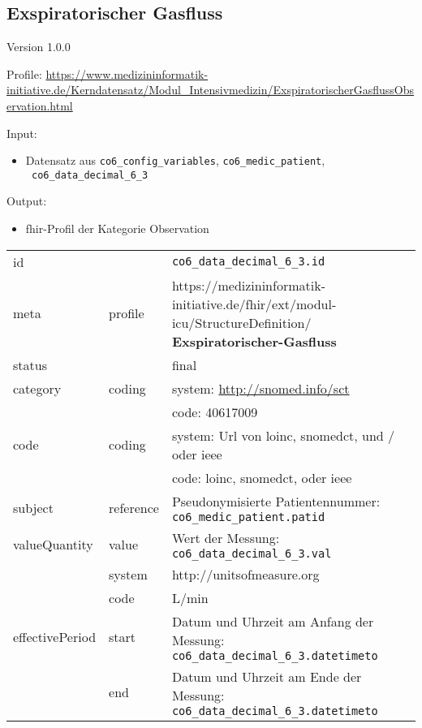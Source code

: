 \subsection{
Exspiratorischer Gasfluss} 
\noindent Version 1.0.0

\noindent Profile: \url{https://www.medizininformatik-initiative.de/Kerndatensatz/Modul_Intensivmedizin/ExspiratorischerGasflussObservation.html}

\noindent Input:
\begin{itemize}
	\item Datensatz aus \texttt{co6\_config\_variables}, \texttt{co6\_medic\_patient}, \\ \texttt{
co6\_data\_decimal\_6\_3}
\end{itemize}
Output:
\begin{itemize}
        \item \ac{fhir}-Profil der Kategorie \glqq Observation\grqq{}
\end{itemize}
\begin{longtable}{|l|l|p{7.5cm}|}
        \hline
        \rowcolor{lightgray} \multicolumn{3}{|l|}{Data Mapping (inhaltlich)} \\ \hline
        id &  & \texttt{co6\_data\_decimal\_6\_3.id} \\ \hline
	meta & profile & https://medizininformatik-initiative.de/fhir/ext/modul-icu/StructureDefinition/\textbf{
Exspiratorischer-Gasfluss} \\ \hline 
	status &  & final  \\ \hline 
	category & coding & system: \url{http://snomed.info/sct} \\
\cline{3-3}
	& & code: 40617009 \\ \hline
	code & coding & system: Url von \ac{loinc}, \ac{snomedct}, und / oder \ac{ieee} \\ 
	\cline{3-3} 
	 &  & code: \ac{loinc}, \ac{snomedct}, oder \ac{ieee} \\ \hline
	subject & reference & Pseudonymisierte Patientennummer: \texttt{co6\_medic\_patient.patid} \\ \hline
	valueQuantity & value & Wert der Messung: \texttt{
co6\_data\_decimal\_6\_3.val} \\
        \cline{2-3}
         & system & http://unitsofmeasure.org \\
         \cline{2-3}
         & code & L/min \\ \hline
    effectivePeriod & start & Datum und Uhrzeit am Anfang der Messung: \texttt{
co6\_data\_decimal\_6\_3.datetimeto} \\
    \cline{2-3}
     & end & Datum und Uhrzeit am Ende der Messung: \texttt{
co6\_data\_decimal\_6\_3.datetimeto} \\ \hline
\end{longtable}


